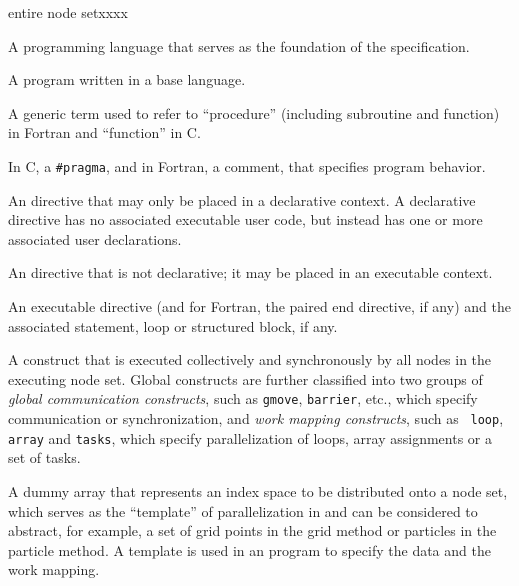 \begin{namelist}{entire node setxxxx}


 A programming language that serves as the foundation of the {\XMP}
 specification.


 A program written in a base language.



 A generic term used to refer to ``procedure'' (including subroutine and
 function) in Fortran and ``function'' in C.


 In C, a {\tt \#pragma}, and in Fortran, a comment, that specifies
 {\XMP} program behavior.


 An {\XMP} directive that may only be placed in a declarative context. A
 declarative directive has no associated executable user code, but
 instead has one or more associated user declarations.


 An {\XMP} directive that is not declarative; it may be placed in an
 executable context.


 An {\XMP} executable directive (and for Fortran, the paired end
 directive, if any) and the associated statement, loop or structured
 block, if any.



 A construct that is executed collectively and synchronously by all
 nodes in the executing node set. Global constructs are further
 classified into two groups of {\it global communication constructs},
 such as {\tt gmove}, {\tt barrier}, etc., which specify communication
 or synchronization, and {\it work mapping constructs}, such as {\tt
 loop}, {\tt array} and {\tt tasks}, which specify parallelization of
 loops, array assignments or a set of tasks.


 A dummy array that represents an index space to be distributed onto a
 node set, which serves as the ``template'' of parallelization in
 {\XMP} and can be considered to abstract, for example, a set of grid
 points in the grid method or particles in the particle method.
%
 A template is used in an {\XMP} program to specify the data and the
 work mapping.


\end{namelist}
